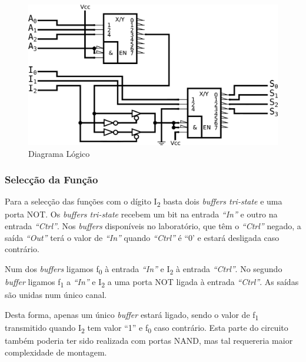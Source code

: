 \documentclass[a4paper,12pt]{article}
\begin{document}
\begin{figure}
\centering
\includegraphics[scale=.1]{logigrama.eps}
\caption{Diagrama Lógico}
\end{figure}

\subsubsection{Selecção da Função}
Para a selecção das funções com o dígito I\textsubscript{2} basta dois 
{\it buffers tri-state} e uma porta NOT. Os {\it buffers tri-state} recebem um 
bit na entrada {\it ``In''} e outro na entrada {\it ``Ctrl''}. Nos {\it 
buffers} disponíveis no laboratório, que têm o {\it ``Ctrl''} negado, a 
saída {\it ``Out''} terá o valor de {\it ``In''} quando {\it ``Ctrl''} é 
``0' e estará desligada caso contrário.
\par
Num dos {\it buffers} ligamos f\textsubscript{0} à entrada {\it ``In''} e 
I\textsubscript{2} à entrada {\it ``Ctrl''}. No segundo {\it buffer} ligamos 
f\textsubscript{1} a {\it ``In''} e I\textsubscript{2} a uma porta NOT ligada 
à entrada {\it ``Ctrl''}. 
As saídas são unidas num único canal. 
\par
Desta forma, apenas um único {\it buffer} estará ligado, sendo o valor de 
f\textsubscript{1} transmitido quando I\textsubscript{2} tem valor ``1'' e 
f\textsubscript{0} caso contrário. Esta parte do circuito também poderia ter 
sido realizada com portas NAND, mas tal requereria maior complexidade de 
montagem.
\par
\end{document}
